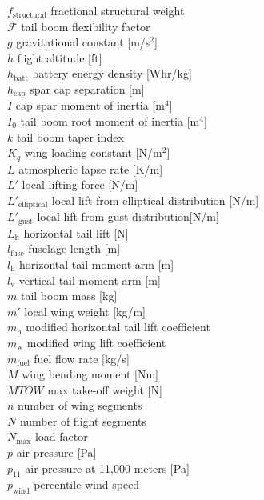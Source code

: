 \documentclass[]{aiaa-tc}%
\begin{document}
\begin{multicols}{2}
\begin{tabbing}
$f_{\text{structural}}$ \> fractional structural weight\\
$\mathcal{F}$ \> tail boom flexibility factor \\
$g$ \> gravitational constant [m/s$^2$] \\
$h$ \> flight altitude [ft] \\
$h_{\text{batt}}$ \> battery energy density [Whr/kg] \\
$h_{\text{cap}}$ \> spar cap separation [m] \\
$I$ \> cap spar moment of inertia [m$^4$] \\
$I_0$ \> tail boom root moment of inertia [m$^4$] \\
$k$ \> tail boom taper index \\
$K_q$ \> wing loading constant [N/m$^2$] \\
$L$ \> atmospheric lapse rate [K/m] \\
$L'$ \> local lifting force [N/m] \\
$L'_{\text{elliptical}}$ \> local lift from elliptical distribution [N/m] \\
$L'_{\text{gust}}$ \> local lift from gust distribution[N/m] \\
$L_\text{h}$ \> horizontal tail lift [N] \\
$l_\text{fuse}$ \> fuselage length [m] \\
$l_\text{h}$ \> horizontal tail moment arm [m] \\
$l_\text{v}$ \> vertical tail moment arm [m] \\
$m$ \> tail boom mass [kg] \\
$m'$ \> local wing weight [kg/m] \\
$m_{\text{h}}$ \> modified horizontal tail lift coefficient \\
$m_{\text{w}}$ \> modified wing lift coefficient \\
$\dot{m}_{\text{fuel}}$ \> fuel flow rate [kg/s] \\
$M$ \> wing bending moment [Nm] \\
$MTOW$ \> max take-off weight [N] \\
$n$ \> number of wing segments \\
$N$ \> number of flight segments \\
$N_{\text{max}}$ \> load factor\\
$p$ \> air pressure [Pa]\\
$p_{11}$ \> air pressure at 11,000 meters [Pa]\\
$p_{\text{wind}}$ \> percentile wind speed \\

\end{tabbing}
\end{multicols}
\end{document}
